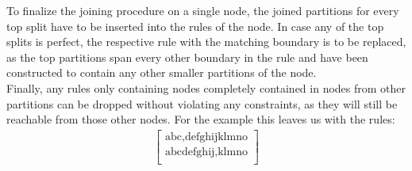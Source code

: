 \noindent
To finalize the joining procedure on a single node, the joined partitions for every top split have to be inserted into the rules of the node. In case any of the top splits is perfect, the respective rule with the matching boundary is to be replaced, as the top partitions span every other boundary in the rule and have been constructed to contain any other smaller partitions of the node.\\
Finally, any rules only containing nodes completely contained in nodes from other partitions can be dropped without violating any constraints, as they will still be reachable from those other nodes. For the example this leaves us with the rules:
{
\ttfamily
\begin{align*}
    \begin{bmatrix}
        \text{abc,defghijklmno}\\
        \text{abcdefghij,klmno}\\
    \end{bmatrix}
\end{align*}
}
%
